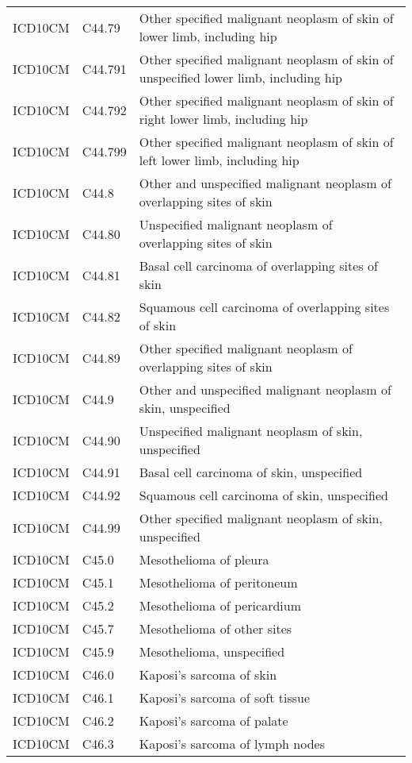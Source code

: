 \begin{longtable}{p{}p{}p{}}
  ICD10CM & C44.79 & Other specified malignant neoplasm of skin of lower limb, including hip \\ 
  ICD10CM & C44.791 & Other specified malignant neoplasm of skin of unspecified lower limb, including hip \\ 
  ICD10CM & C44.792 & Other specified malignant neoplasm of skin of right lower limb, including hip \\ 
  ICD10CM & C44.799 & Other specified malignant neoplasm of skin of left lower limb, including hip \\ 
  ICD10CM & C44.8 & Other and unspecified malignant neoplasm of overlapping sites of skin \\ 
  ICD10CM & C44.80 & Unspecified malignant neoplasm of overlapping sites of skin \\ 
  ICD10CM & C44.81 & Basal cell carcinoma of overlapping sites of skin \\ 
  ICD10CM & C44.82 & Squamous cell carcinoma of overlapping sites of skin \\ 
  ICD10CM & C44.89 & Other specified malignant neoplasm of overlapping sites of skin \\ 
  ICD10CM & C44.9 & Other and unspecified malignant neoplasm of skin, unspecified \\ 
  ICD10CM & C44.90 & Unspecified malignant neoplasm of skin, unspecified \\ 
  ICD10CM & C44.91 & Basal cell carcinoma of skin, unspecified \\ 
  ICD10CM & C44.92 & Squamous cell carcinoma of skin, unspecified \\ 
  ICD10CM & C44.99 & Other specified malignant neoplasm of skin, unspecified \\ 
  ICD10CM & C45.0 & Mesothelioma of pleura \\ 
  ICD10CM & C45.1 & Mesothelioma of peritoneum \\ 
  ICD10CM & C45.2 & Mesothelioma of pericardium \\ 
  ICD10CM & C45.7 & Mesothelioma of other sites \\ 
  ICD10CM & C45.9 & Mesothelioma, unspecified \\ 
  ICD10CM & C46.0 & Kaposi's sarcoma of skin \\ 
  ICD10CM & C46.1 & Kaposi's sarcoma of soft tissue \\ 
  ICD10CM & C46.2 & Kaposi's sarcoma of palate \\ 
  ICD10CM & C46.3 & Kaposi's sarcoma of lymph nodes \\ 

\end{longtable}
